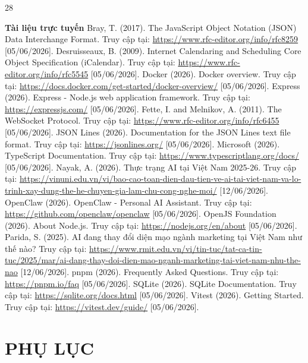 \documentclass[a4paper]{article}
\begin{document}
\begin{thebibliography}{28}
\item[]{\bfseries Tài liệu trực tuyến}\vspace{0.15cm}
 Bray, T. (2017). The JavaScript Object Notation (JSON) Data Interchange Format. Truy cập tại: \url{https://www.rfc-editor.org/info/rfc8259} [05/06/2026].
 Desruisseaux, B. (2009). Internet Calendaring and Scheduling Core Object Specification (iCalendar). Truy cập tại: \url{https://www.rfc-editor.org/info/rfc5545} [05/06/2026].
 Docker (2026). Docker overview. Truy cập tại: \url{https://docs.docker.com/get-started/docker-overview/} [05/06/2026].
 Express (2026). Express - Node.js web application framework. Truy cập tại: \url{https://expressjs.com/} [05/06/2026].
 Fette, I. and Melnikov, A. (2011). The WebSocket Protocol. Truy cập tại: \url{https://www.rfc-editor.org/info/rfc6455} [05/06/2026].
 JSON Lines (2026). Documentation for the JSON Lines text file format. Truy cập tại: \url{https://jsonlines.org/} [05/06/2026].
 Microsoft (2026). TypeScript Documentation. Truy cập tại: \url{https://www.typescriptlang.org/docs/} [05/06/2026].
 Nayak, A. (2026). Thực trạng AI tại Việt Nam 2025-26. Truy cập tại: \url{https://vinuni.edu.vn/vi/bao-cao-toan-dien-dau-tien-ve-ai-tai-viet-nam-va-lo-trinh-xay-dung-the-he-chuyen-gia-lam-chu-cong-nghe-moi/} [12/06/2026].
 OpenClaw (2026). OpenClaw - Personal AI Assistant. Truy cập tại: \url{https://github.com/openclaw/openclaw} [05/06/2026].
 OpenJS Foundation (2026). About Node.js. Truy cập tại: \url{https://nodejs.org/en/about} [05/06/2026].
 Parida, S. (2025). AI đang thay đổi diện mạo ngành marketing tại Việt Nam như thế nào? Truy cập tại: \url{https://www.rmit.edu.vn/vi/tin-tuc/tat-ca-tin-tuc/2025/mar/ai-dang-thay-doi-dien-mao-nganh-marketing-tai-viet-nam-nhu-the-nao} [12/06/2026].
 pnpm (2026). Frequently Asked Questions. Truy cập tại: \url{https://pnpm.io/faq} [05/06/2026].
 SQLite (2026). SQLite Documentation. Truy cập tại: \url{https://sqlite.org/docs.html} [05/06/2026].
 Vitest (2026). Getting Started. Truy cập tại: \url{https://vitest.dev/guide/} [05/06/2026].
\end{thebibliography}

\clearpage
\section*{PHỤ LỤC}
\end{document}
